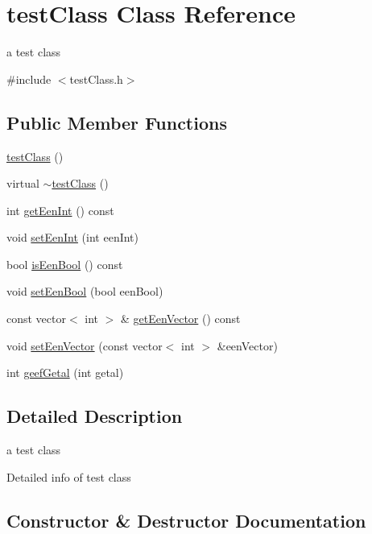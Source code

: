 \hypertarget{classtest_class}{}\section{test\+Class Class Reference}
\label{classtest_class}


a test class  




{\ttfamily \#include $<$test\+Class.\+h$>$}

\subsection*{Public Member Functions}
\begin{DoxyCompactItemize}
\item 
\mbox{\hyperlink{classtest_class_a3d64d721f31d063697796556e628d533}{test\+Class}} ()
\item 
virtual \mbox{\hyperlink{classtest_class_a7dd1f9f17dbebd79a82624a326161ffa}{$\sim$test\+Class}} ()
\item 
int \mbox{\hyperlink{classtest_class_a4c40d71a857dfa40018d493b56c5a88f}{get\+Een\+Int}} () const
\item 
void \mbox{\hyperlink{classtest_class_a807b103688091e9b8dff46b563411b59}{set\+Een\+Int}} (int een\+Int)
\item 
bool \mbox{\hyperlink{classtest_class_a612e143a01b0be6d2cdfc1d9387ce419}{is\+Een\+Bool}} () const
\item 
void \mbox{\hyperlink{classtest_class_a1cfdd64874baa4278adc3eb196f2e2f0}{set\+Een\+Bool}} (bool een\+Bool)
\item 
const vector$<$ int $>$ \& \mbox{\hyperlink{classtest_class_af95bb3c6a2ce889dd87e93810aac8682}{get\+Een\+Vector}} () const
\item 
void \mbox{\hyperlink{classtest_class_a0f8b2f1e5612649a54f98e004af8dc55}{set\+Een\+Vector}} (const vector$<$ int $>$ \&een\+Vector)
\item 
int \mbox{\hyperlink{classtest_class_acd7ccefcfdbaf6aeccdddcc121f97f9d}{geef\+Getal}} (int getal)
\end{DoxyCompactItemize}


\subsection{Detailed Description}
a test class 

Detailed info of test class 

\subsection{Constructor \& Destructor Documentation}
\mbox{\label{classtest_class_a3d64d721f31d063697796556e628d533}} 
